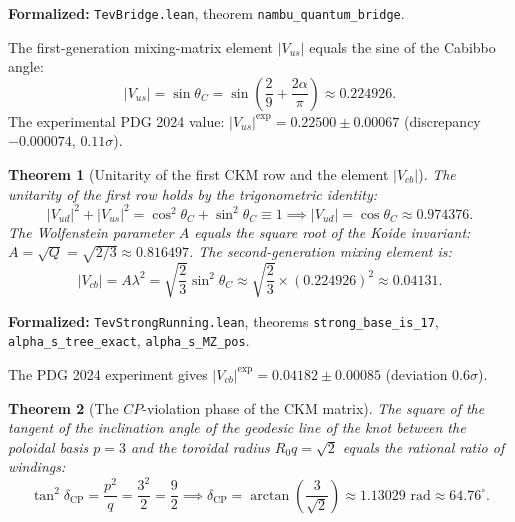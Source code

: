 \documentclass[11pt,a4paper]{article}
\newtheorem{theorem}{Theorem}
\theoremstyle{definition}
\theoremstyle{remark}
\begin{document}
\noindent\small\textbf{Formalized:} \texttt{TevBridge.lean}, theorem \texttt{nambu_quantum_bridge}.
	
The first-generation mixing-matrix element $|V_{us}|$ equals the sine of the Cabibbo angle:
\begin{equation}
	|V_{us}| = \sin\theta_C = \sin\left(\frac{2}{9} + \frac{2\alpha}{\pi}\right) \approx 0.224926.
	\label{eq:V_us_exact}
\end{equation}
The experimental PDG 2024 value: $|V_{us}|^{\mathrm{exp}} = 0.22500 \pm 0.00067$ (discrepancy $-0.000074$, $0.11\sigma$).
	
\begin{theorem}[Unitarity of the first CKM row and the element $|V_{cb}|$]
\label{thm:wolfenstein_cb}
The unitarity of the first row holds by the trigonometric identity:
\begin{equation}
	|V_{ud}|^2 + |V_{us}|^2 = \cos^2\theta_C + \sin^2\theta_C \equiv 1 \implies |V_{ud}| = \cos\theta_C \approx 0.974376.
	\label{eq:V_ud_exact}
\end{equation}
	The Wolfenstein parameter $A$ equals the square root of the Koide invariant: $A = \sqrt{Q} = \sqrt{2/3} \approx 0.816497$. The second-generation mixing element is:
\begin{equation}
	|V_{cb}| = A \lambda^2 = \sqrt{\frac{2}{3}} \sin^2\theta_C \approx \sqrt{\frac{2}{3}} \times (0.224926)^2 \approx 0.04131.
	\label{eq:V_cb_exact}
\end{equation}
\end{theorem}

\noindent\small\textbf{Formalized:} \texttt{TevStrongRunning.lean}, theorems \texttt{strong_base_is_17}, \texttt{alpha_s_tree_exact}, \texttt{alpha_s_MZ_pos}.

The PDG 2024 experiment gives $|V_{cb}|^{\mathrm{exp}} = 0.04182 \pm 0.00085$ (deviation $0.6\sigma$).

\begin{theorem}[The $CP$-violation phase of the CKM matrix]
\label{thm:delta_cp_exact}
The square of the tangent of the inclination angle of the geodesic line of the knot between the poloidal basis $p=3$ and the toroidal radius $R_0 q = \sqrt{2}$ equals the rational ratio of windings:
\begin{equation}
	\tan^2\delta_{\mathrm{CP}} = \frac{p^2}{q} = \frac{3^2}{2} = \frac{9}{2} \implies \delta_{\mathrm{CP}} = \arctan\left(\frac{3}{\sqrt{2}}\right) \approx 1.13029\text{ rad} \approx 64.76^\circ.
\label{eq:delta_cp_exact}
\end{equation}
\end{theorem}
\end{document}

